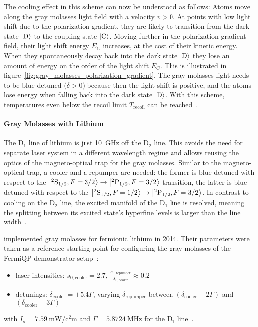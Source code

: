 The cooling effect in this scheme can now be understood as follows: Atoms move along the gray molasses light field with a velocity $v > 0$. At points with low light shift due to the polarization gradient, they are likely to transition from the dark state $\Ket{\text{D}}$ to the coupling state $\Ket{\text{C}}$. Moving further in the polarization-gradient field, their light shift energy $E_C$ increases, at the cost of their kinetic energy. When they spontaneously decay back into the dark state $\Ket{\text{D}}$ they lose an amount of energy on the order of the light shift $E_C$. This is illustrated in figure~\ref{fig:gray_molasses_polarization_gradient}. The gray molasses light needs to be blue detuned ($\delta > 0$) because then the light shift is positive, and the atoms lose energy when falling back into the dark state $\Ket{\text{D}}$. With this scheme,  temperatures even below the recoil limit $T_\text{recoil}$ can be reached~\cite{weidemuller_novel_1994,gerken_gray_2016}.


\paragraph{Gray Molasses with Lithium} The D$_1$ line of lithium is just \SI{10}{\giga\hertz} off the D$_2$ line. This avoids the need for separate laser system in a different wavelength regime and  allows reusing the optics of the magneto-optical trap for the gray molasses. Similar to the magneto-optical trap, a cooler and a repumper are needed: the former is blue detuned with respect to the $\Ket{^2\text{S}_{1/2}, F = 3/2} \rightarrow \Ket{^2\text{P}_{1/2}, F = 3/2}$ transition, the latter is blue detuned with respect to the $\Ket{^2\text{S}_{1/2}, F = 1/2} \rightarrow \Ket{^2\text{P}_{1/2}, F = 3/2}$. In contrast to cooling on the D$_2$ line, the excited manifold of the D$_1$ line is resolved, meaning the splitting between its excited state's hyperfine levels is larger than the line width~\cite{gerken_gray_2016}.

\citeauthor{burchianti_efficient_2014} implemented gray molasses for fermionic lithium in 2014. Their parameters were taken as a reference starting point for configuring the gray molasses of the FermiQP demonstrator setup~\cite{burchianti_efficient_2014}:
\begin{itemize}
    \item laser intensities: $s_{0, \text{cooler}} = 2.7$, $\frac{s_{0, \text{repumper}}}{s_{0, \text{cooler}}} \approx 0.2$
    \item detunings: $\delta_\text{cooler} = +5.4 \Gamma$, varying $\delta_\text{repumper}$ between $(\delta_\text{cooler} -2 \Gamma)$ and  $(\delta_\text{cooler}+ 3\Gamma)$
\end{itemize}
with $I_s = \SI{7.59}{\milli\watt\per\square\centi\meter}$ and $\Gamma = \SI{5.8724}{\mega\hertz}$ for the D$_1$ line~\cite{gehm_properties_2003}.


